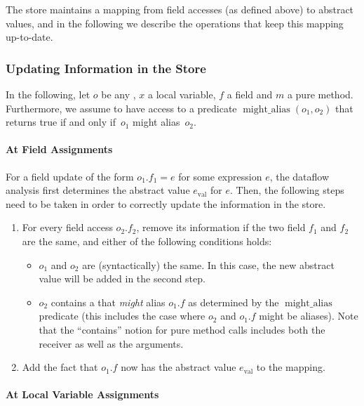 The store maintains a mapping from field accesses (as defined above) to
abstract values, and in the following we describe the operations that
keep this mapping up-to-date.

\subsubsection{Updating Information in the Store}

\newcommand{\alias}{\operatorname{might\_alias}}

In the following, let $o$ be any ,
$x$ a local variable, $f$ a
field and $m$ a pure method.  Furthermore, we assume to have access to
a predicate $\alias(o_1,o_2)$ that returns true if and only
if~$o_1$ might alias~$o_2$.

\paragraph{At Field Assignments}
For a field update of the form $o_1.f_1 = e$ for some expression $e$, the
dataflow analysis first determines the abstract value $e_\text{val}$ for $e$.
Then, the following steps need to be taken in order to correctly update
the information in the store.
\begin{enumerate}
    \item For every field access $o_2.f_2$, remove its information if
    the two field $f_1$ and $f_2$ are the same, and either of the following
    conditions holds:
    \begin{itemize}
        \item $o_1$ and $o_2$ are (syntactically) the same.  In this case, the
        new abstract value will be added in the second step.
        \item $o_2$ contains a  that \emph{might}
        alias $o_1.f$ as determined by the $\alias$
        predicate (this includes the case where $o_2$ and $o_1.f$ might be
        aliases).  Note that the ``contains'' notion for pure method calls
        includes both the receiver as well as the arguments.
    \end{itemize}
    \item Add the fact that $o_1.f$ now has the abstract value $e_\text{val}$
    to the mapping.
\end{enumerate}


\paragraph{At Local Variable Assignments}

